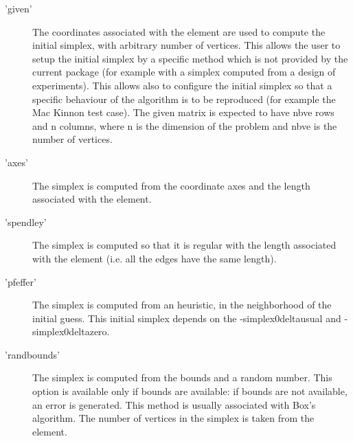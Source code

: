 \begin{Details}
\begin{description}
\begin{description}
\item['given'] The coordinates associated with the 
element are used to compute the initial simplex, with arbitrary number
of vertices. This allows the user to setup the initial simplex by a
specific method which is not provided by the current package (for
example with a simplex computed from a design of experiments). This
allows also to configure the initial simplex so that a specific
behaviour of the algorithm is to be reproduced (for example the Mac
Kinnon test case). The given matrix is expected to have nbve rows and
n columns, where n is the dimension of the problem and nbve is the
number of vertices.
\item['axes'] The simplex is computed from the coordinate axes and the
length associated with the  element.
\item['spendley'] The simplex is computed so that it is regular with
the length associated with the  element (i.e. all
the edges have the same length).
\item['pfeffer'] The simplex is computed from an heuristic, in the
neighborhood of the initial guess. This initial simplex depends on
the -simplex0deltausual and -simplex0deltazero.
\item['randbounds'] The simplex is computed from the bounds and a
random number. This option is available only if bounds are available:
if bounds are not available, an error is generated. This method is
usually associated with Box's algorithm. The number of vertices in
the simplex is taken from the  element.

\end{description}



\end{description}
\end{Details}

